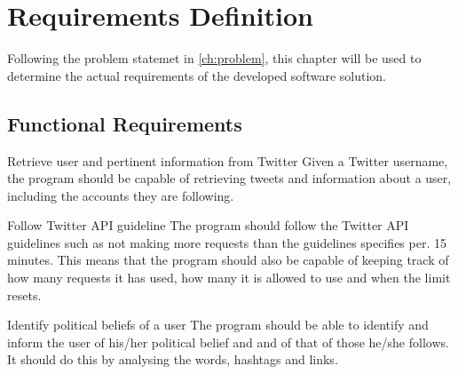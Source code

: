 \chapter{Requirements Definition}\label{cha:req}
Following the problem statemet in \autoref{ch:problem}, this chapter will be
used to determine the actual requirements of the developed software solution.


\section{Functional Requirements}

\begin{requirement}{Retrieve user and pertinent information from Twitter}
Given a Twitter username, the program should be capable of retrieving
tweets and information about a user, including the accounts they are following.
\end{requirement}

\begin{requirement}{Follow Twitter \ac{API} guideline}
The program should follow the Twitter \ac{API} guidelines such as not making
more requests than the guidelines specifies per. 15 minutes. This means that the
program should also be capable of keeping track of how many requests it has
used, how many it is allowed to use and when the limit resets.
\end{requirement}

\begin{requirement}{Identify political beliefs of a user}
The program should be able to identify and inform the user of his/her political
belief and and of that of those he/she follows. It should do this by analysing
the words, hashtags and links.

\end{requirement}


